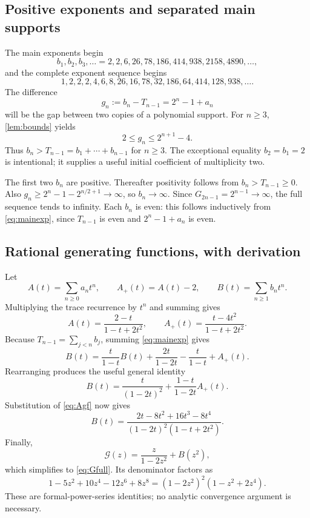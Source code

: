 \documentclass[11pt]{article}
\theoremstyle{definition}\newtheorem{definition}[theorem]{Definition}
\theoremstyle{remark}\newtheorem{remark}[theorem]{Remark}
\newcommand{\GF}{\mathcal G}
\begin{document}
\subsection{Positive exponents and separated main supports}

The main exponents begin
\[
 b_1,b_2,b_3,\ldots=2,2,6,26,78,186,414,938,2158,4890,\ldots,
\]
and the complete exponent sequence begins
\begin{equation}\label{eq:Ginitial}
 1,2,2,2,4,6,8,26,16,78,32,186,64,414,128,938,\ldots.
\end{equation}
The difference
\begin{equation}\label{eq:gaps}
 g_n:=b_n-T_{n-1}=2^n-1+a_n
\end{equation}
will be the gap between two copies of a polynomial support. For $n\geq3$, \cref{lem:bounds} yields
\begin{equation}\label{eq:gapbounds}
 2\leq g_n\leq2^{n+1}-4.
\end{equation}
Thus $b_n>T_{n-1}=b_1+\cdots+b_{n-1}$ for $n\geq3$. The exceptional equality $b_2=b_1=2$ is intentional; it supplies a useful initial coefficient of multiplicity two.

The first two $b_n$ are positive. Thereafter positivity follows from $b_n>T_{n-1}\geq0$. Also $g_n\geq2^n-1-2^{n/2+1}\to\infty$, so $b_n\to\infty$. Since $G_{2n-1}=2^{n-1}\to\infty$, the full sequence tends to infinity. Each $b_n$ is even: this follows inductively from \eqref{eq:mainexp}, since $T_{n-1}$ is even and $2^n-1+a_n$ is even.

\subsection{Rational generating functions, with derivation}

Let
\[
 A(t)=\sum_{n\geq0}a_nt^n,\qquad A_+(t)=A(t)-2,
 \qquad B(t)=\sum_{n\geq1}b_nt^n.
\]
Multiplying the trace recurrence by $t^n$ and summing gives
\begin{equation}\label{eq:Agf}
 A(t)=\frac{2-t}{1-t+2t^2},\qquad
 A_+(t)=\frac{t-4t^2}{1-t+2t^2}.
\end{equation}
Because $T_{n-1}=\sum_{j<n}b_j$, summing \eqref{eq:mainexp} gives
\[
 B(t)=\frac{t}{1-t}B(t)+\frac{2t}{1-2t}-\frac{t}{1-t}+A_+(t).
\]
Rearranging produces the useful general identity
\begin{equation}\label{eq:Bcontrol}
 B(t)=\frac{t}{(1-2t)^2}+\frac{1-t}{1-2t}A_+(t).
\end{equation}
Substitution of \eqref{eq:Agf} now gives
\begin{equation}\label{eq:Bgf}
 B(t)=\frac{2t-8t^2+16t^3-8t^4}
 {(1-2t)^2(1-t+2t^2)}.
\end{equation}
Finally,
\[
 \GF(z)=\frac{z}{1-2z^2}+B(z^2),
\]
which simplifies to \eqref{eq:Gfull}. Its denominator factors as
\begin{equation}\label{eq:Dfactor}
 1-5z^2+10z^4-12z^6+8z^8
 =(1-2z^2)^2(1-z^2+2z^4).
\end{equation}
These are formal-power-series identities; no analytic convergence argument is necessary.
\end{document}
